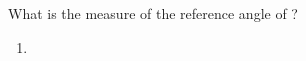 What is the measure of the reference angle of \degree?
\newline
\begin{enumerate}
    \item
    \degree
{}
\end{enumerate}

